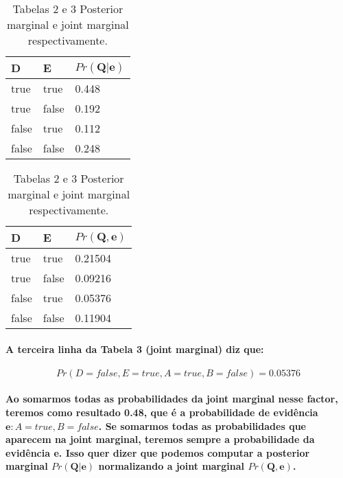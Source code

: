 \documentclass[a4paper,10pt]{article}
\theoremstyle{plain}
\begin{document}
\begin{table}[h]
  \begin{center}
    \captionsetup{justification=centering}
    \begin{tabular}{*{2}{l} | l}
      D & E & $Pr(\textbf{Q} | \textbf{e})$ \\
      \hline
      true & true & 0.448 \\
      true & false & 0.192 \\
      false & true & 0.112 \\
      false & false & 0.248 \\
    \end{tabular}
    \quad
    \quad
    \begin{tabular}{*{2}{l} | l}
      D & E & $Pr(\textbf{Q}, \textbf{e})$ \\
      \hline
      true & true & 0.21504 \\
      true & false & 0.09216 \\
      false & true & 0.05376 \\
      false & false & 0.11904 \\
    \end{tabular}
    \caption*{Tabelas 2 e 3 Posterior marginal e joint marginal respectivamente.}
  \end{center}
\end{table}
\setcounter{table}{3}

\paragraph{
  A terceira linha da Tabela 3 (joint marginal) diz que:
}

\begin{equation}
  Pr(D = false, E = true, A = true, B = false) = 0.05376
\end{equation}

\paragraph{
  Ao somarmos todas as probabilidades da joint marginal nesse factor, teremos como resultado 0.48,
  que é a probabilidade de evidência $\textbf{e}: A = true, B = false$. Se somarmos todas as 
  probabilidades que aparecem na joint marginal, teremos sempre a probabilidade da evidência 
  \textbf{e}. Isso quer dizer que podemos computar a posterior marginal $Pr(\textbf{Q}|\textbf{e})$
  normalizando a joint marginal $Pr(\textbf{Q}, \textbf{e})$.
}
\end{document}
